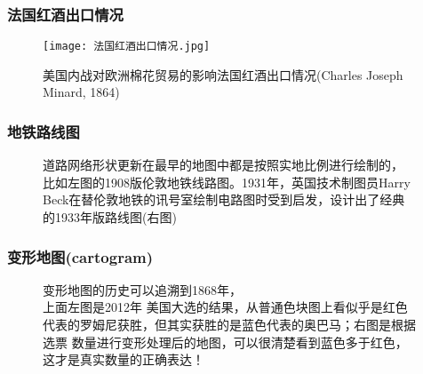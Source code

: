 \subsubsection{法国红酒出口情况}
\begin{frame}{\subsecname}{}
 \begin{figure}
   \centering \texttt{[image: 法国红酒出口情况.jpg]}
   \caption{美国内战对欧洲棉花贸易的影响法国红酒出口情况(Charles
     Joseph Minard, 1864)}
 \end{figure}
\end{frame}

\subsubsection{地铁路线图}
\begin{frame}{\subsecname}{\subsubsecname}
  \begin{figure}\centering
    \vspace{0.5pt} 
    \caption{道路网络形状更新在最早的地图中都是按照实地比例进行绘制的，
      比如左图的1908版伦敦地铁线路图。1931年，英国技术制图员Harry
      Beck在替伦敦地铁的讯号室绘制电路图时受到启发，设计出了经典
      的1933年版路线图(右图)}
  \end{figure} 
\end{frame}

\subsubsection{变形地图(cartogram)}
\begin{frame}{\subsecname}{\subsubsecname}
  \begin{figure}\centering
    \vspace{0.5pt}
    \caption{变形地图的历史可以追溯到1868年，\\上面左图是2012年
      美国大选的结果，从普通色块图上看似乎是红色代表的罗姆尼获胜，但其实获胜的是蓝色代表的奥巴马；右图是根据选票
      数量进行变形处理后的地图，可以很清楚看到蓝色多于红色，这才是真实数量的正确表达！}
  \end{figure}
\end{frame}

